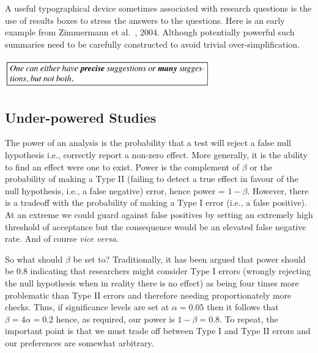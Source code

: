 \documentclass[10pt]{elsarticle}
\newcommand{\RED}{\color{black}}
\newcommand{\BLACK}{\color{black}}
\begin{document}
A useful typographical device sometimes associated with research questions is the use of results boxes to stress the answers to the questions. Here is an early example from Zimmermann et al.~\cite{Zimmermann04}, 2004. Although potentially powerful such summaries need to be carefully constructed to avoid trivial over-simplification.

\centerline{\includegraphics[width=3.5in]{fig/resultbox.png}}



\subsection{Under-powered Studies}

The power of an analysis is the probability that a test will reject a false null hypothesis i.e., correctly report a non-zero effect. \RED More generally, it is the ability to find an effect were one to exist.  Power \BLACK is the complement of $\beta$ or the probability of making a Type II (failing to detect a true effect in favour of the null hypothesis, i.e., a false negative) error, hence power = $1 - \beta$.  
\RED However, there is a tradeoff with the probability of making a Type I error (i.e., a false positive).  At an extreme we could guard against false positives by setting an extremely high threshold of acceptance but the consequence would be an elevated false negative rate.  And of course \textit{vice versa}. \BLACK

\RED So what should $\beta$ be set to?  \BLACK Traditionally, it has been argued that power should be 0.8 \cite{Cohe88} indicating that researchers might consider Type I errors (wrongly rejecting the null hypothesis when in reality there is no effect) as being four times more problematic than Type II errors and therefore needing proportionately more checks. Thus, if significance levels are set at $\alpha=0.05$ then it follows that $\beta = 4\alpha = 0.2$ hence, as required, our power is $1 - \beta = 0.8$.  To repeat, the important point is that we must trade off between Type I and Type II errors and our preferences are somewhat arbitrary.
\end{document}
